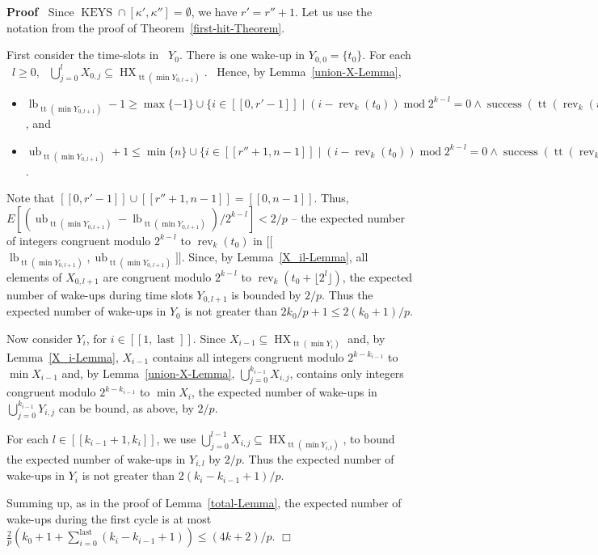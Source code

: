 \documentclass{article}
\newcommand{\tmop}[1]{\ensuremath{\operatorname{#1}}}
\newenvironment{proof}{\noindent\textbf{Proof\ }}{\hspace*{\fill}$\Box$\medskip}
\begin{document}
\begin{proof}
  Since $\tmop{KEYS} \cap [\kappa', \kappa''] = \emptyset$, we have $r' = r''
  + 1$. Let us use the notation from the proof of
  Theorem~\ref{first-hit-Theorem}.
  
  First consider the time-slots in \ $Y_0$. There is one wake-up in $Y_{0, 0}
  =\{t_0 \}$. For each \ $l \geq 0$, \ $\bigcup_{j = 0}^l X_{0, j} \subseteq
  \tmop{HX}_{\tmop{tt} (\min Y_{0, l + 1})}$. \ Hence, by
  Lemma~\ref{union-X-Lemma}, 
\begin{itemize}
  \item
  $\tmop{lb}_{\tmop{tt} (\min Y_{0, l + 1})} - 1
  \geq 
  \max \{- 1\} \cup \{i \in [[0, r' - 1]] \;|\; (i - \tmop{rev}_k (t_0))
  \tmop{mod} 2^{k - l} = 0 \wedge \tmop{success} (\tmop{tt} (\tmop{rev}_k
  (i)))\}$, and
\item 
  $\tmop{ub}_{\tmop{tt} (\min Y_{0, l + 1})} + 1 
  \leq 
  \min \{n\}
  \cup \{i \in [[r'' + 1, n - 1]] \;|\; (i - \tmop{rev}_k (t_0)) \tmop{mod} 2^{k -
  l} = 0 \wedge \tmop{success} (\tmop{tt} (\tmop{rev}_k (i)))\}$.
\end{itemize}
 Note that
  $[[0, r' - 1]] \cup [[r'' + 1, n - 1]] = [[0, n - 1]]$. Thus, $E
  [(\tmop{ub}_{\tmop{tt} (\min Y_{0, l + 1})} - \tmop{lb}_{\tmop{tt} (\min
  Y_{0, l + 1})}) / 2^{k - l}] < 2 / p$ -- the expected number of integers
  congruent modulo $2^{k - l}$ to $\tmop{rev}_k (t_0)$ in
  [[$\tmop{lb}_{\tmop{tt} (\min Y_{0, l + 1})}, \tmop{ub}_{\tmop{tt} (\min
  Y_{0, l + 1})}]]$. Since, by Lemma~\ref{X_il-Lemma}, all elements of $X_{0,
  l + 1}$ are congruent modulo $2^{k - l}$ to $\tmop{rev}_k (t_0 + \lfloor 2^l
  \rfloor)$, the expected number of wake-ups during time slots $Y_{0, l + 1}$
  is bounded by $2 / p$. Thus the expected number of wake-ups in $Y_0$ is not
  greater than $2 k_0 / p + 1 \leq 2 (k_0 + 1) / p$.
  
  Now consider $Y_i$, for $i \in [[1, \tmop{last}]]$. Since $X_{i - 1}
  \subseteq \tmop{HX}_{\tmop{tt} (\min Y_i)}$ and, by Lemma~\ref{X_i-Lemma},
  $X_{i - 1}$ contains all integers congruent modulo $2^{k - k_{i - 1}}$ to
  $\min X_{i - 1}$ and, by Lemma~\ref{union-X-Lemma}, $\bigcup_{j = 0}^{k_{i -
  1}} X_{i, j}$, contains only integers congruent modulo $2^{k - k_{i - 1}}$
  to $\min X_i$, the expected number of wake-ups in $ \bigcup_{j = 0}^{k_{i -
  1}} Y_{i, j}$ can be bound, as above, by $2 / p$.
  
  For each $l \in [[k_{i - 1} + 1, k_i]]$, we use $\bigcup_{j = 0}^{l - 1}
  X_{i, j} \subseteq \tmop{HX}_{\tmop{tt} (\min Y_{i, l})}$, to bound the
  expected number of wake-ups in $Y_{i, l}$ by $2 / p$. Thus the expected
  number of wake-ups in $Y_i$ is not greater than $2 (k_i - k_{i - 1} + 1) /
  p$.
  
  Summing up, as in the proof of Lemma~\ref{total-Lemma}, the expected
  number of wake-ups during the first cycle is at most $\frac{2}{p} (k_0 + 1 +
  \sum_{i = 0}^{\tmop{last}} (k_i - k_{i - 1} + 1)) \leq (4 k + 2) / p$.
\end{proof}
\end{document}
